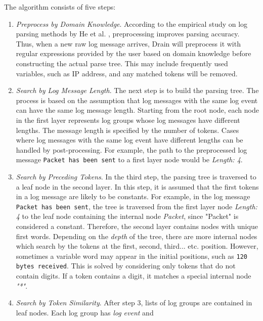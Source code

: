     The algorithm consists of five steps: 
    
    \begin{enumerate}
        \item \textit{Preprocess by Domain Knowledge}. According to the empirical study on log parsing methods by He et al. \cite{logParsingEvaluation2016}, preprocessing improves parsing accuracy. Thus, when a new raw log message arrives, Drain will preprocess it with regular expressions provided by the user based on domain knowledge before constructing the actual parse tree. This may include frequently used variables, such as IP address, and any matched tokens will be removed. 
        
        \item \textit{Search by Log Message Length}. The next step is to build the parsing tree. The process is based on the assumption that log messages with the same log event can have the same log message length. Starting from the root node, each node in the first layer represents log groups whose log messages have different lengths. The message length is specified by the number of tokens. Cases where log messages with the same log event have different lengths can be handled by post-processing. For example, the path to the preprocessed log message \texttt{Packet has been sent} to a first layer node would be \textit{Length: 4}.
        
        \item \textit{Search by Preceding Tokens}. In the third step, the parsing tree is traversed to a leaf node in the second layer. In this step, it is assumed that the first tokens in a log message are likely to be constants. For example, in the log message \texttt{Packet has been sent}, the tree is traversed from the first layer node \textit{Length: 4} to the leaf node containing the internal node \textit{Packet}, since "Packet" is considered a constant. Therefore, the second layer contains nodes with unique first words. Depending on the \textit{depth} of the tree, there are more internal nodes which search by the tokens at the first, second, third... etc. position. However, sometimes a variable word may appear in the initial positions, such as \texttt{120 bytes received}. This is solved by considering only tokens that do not contain digits. If a token contains a digit, it matches a special internal node \textit{"*"}. 
        \item \textit{Search by Token Similarity}. After step 3, lists of log groups are contained in leaf nodes. Each log group has \textit{log event} and
        

\end{enumerate}
